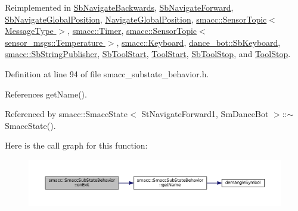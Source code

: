 Reimplemented in \hyperlink{classSbNavigateBackwards_afc23bccc5d951e064bd8a9283934e7ec}{Sb\+Navigate\+Backwards}, \hyperlink{classSbNavigateForward_ac16315240c9dd4e5e7f3681455f997cb}{Sb\+Navigate\+Forward}, \hyperlink{classSbNavigateGlobalPosition_a9a002dcd2bcc35d8f87f79d32e47fb3c}{Sb\+Navigate\+Global\+Position}, \hyperlink{classNavigateGlobalPosition_aa5e17638bdf3944631e81d901632bb72}{Navigate\+Global\+Position}, \hyperlink{classsmacc_1_1SensorTopic_a563d6288b66605ca99320eab5de9cfba}{smacc\+::\+Sensor\+Topic$<$ Message\+Type $>$}, \hyperlink{classsmacc_1_1Timer_a5984dee1815d8626f7728c08aa7c6278}{smacc\+::\+Timer}, \hyperlink{classsmacc_1_1SensorTopic_a563d6288b66605ca99320eab5de9cfba}{smacc\+::\+Sensor\+Topic$<$ sensor\+\_\+msgs\+::\+Temperature $>$}, \hyperlink{classsmacc_1_1Keyboard_a494dd2f35c5b1fb520b4f4cd4b61b6a9}{smacc\+::\+Keyboard}, \hyperlink{classdance__bot_1_1SbKeyboard_ad5fd380851ab0447dd63524a55eeb741}{dance\+\_\+bot\+::\+Sb\+Keyboard}, \hyperlink{classsmacc_1_1SbStringPublisher_a6e8de8b5d553092467ae980aa08ae576}{smacc\+::\+Sb\+String\+Publisher}, \hyperlink{classSbToolStart_ade7a5c2b52056ba0bb6c089c8d8b4949}{Sb\+Tool\+Start}, \hyperlink{classToolStart_ab258607079d47d3ef0da92c085020bd4}{Tool\+Start}, \hyperlink{classSbToolStop_a297d4c079bc5d8d06010dcf28cff98dc}{Sb\+Tool\+Stop}, and \hyperlink{classToolStop_a8c5028c3e7aa2de0b5b48793d38784b3}{Tool\+Stop}.



Definition at line 94 of file smacc\+\_\+substate\+\_\+behavior.\+h.



References get\+Name().



Referenced by smacc\+::\+Smacc\+State$<$ St\+Navigate\+Forward1, Sm\+Dance\+Bot $>$\+::$\sim$\+Smacc\+State().




Here is the call graph for this function\+:
\nopagebreak
\begin{figure}[H]
\begin{center}
\leavevmode
\includegraphics[width=350pt]{classsmacc_1_1SmaccSubStateBehavior_ab78b9de76c04a7ab6c16d5924e216ef9_cgraph}
\end{center}
\end{figure}




